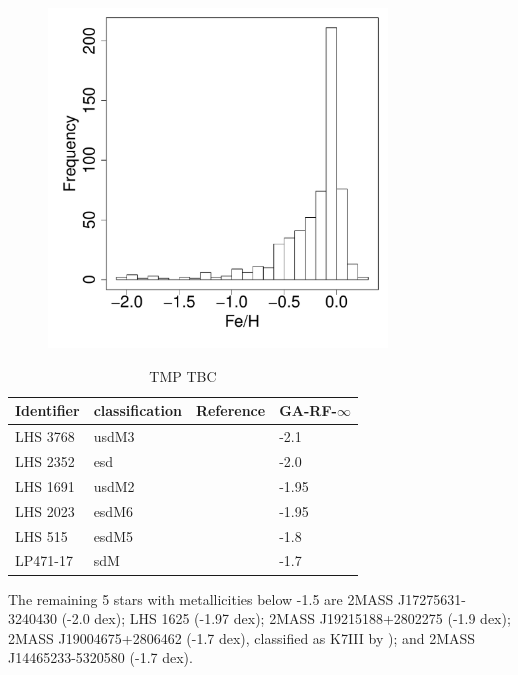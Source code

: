 \begin{figure}
	\begin{center}
		\includegraphics[width=9cm]{figs/ipac-figs/ipac-M-hist.pdf}
		\caption{}
		\label{fig:ipac-hist-mets}
	\end{center}
\end{figure}


\begin{table}\centering
	\begin{tabular}{@{}llll@{}}
		\toprule
		Identifier & classification & Reference & GA-RF-$\infty$\\
		\hline
		LHS 3768 & usdM3 & \cite{1995AJ....109..797K}  & -2.1 \\
		LHS 2352 & esd   & \cite{1995AJ....109..797K}  & -2.0 \\
		LHS 1691 & usdM2 & \cite{0004-637X-669-2-1235} & -1.95\\
		LHS 2023 & esdM6 & \cite{0004-637X-672-2-1153} & -1.95\\
		LHS 515  & esdM5 & \cite{1538-3873-117-833-676}& -1.8\\
		LP471-17 & sdM   & \cite{1995AJ....109..797K}  & -1.7\\
		\bottomrule
	\end{tabular}
	\caption{TMP TBC} 
	\label{tab:known-sds} 
\end{table}

The remaining 5 stars with metallicities below -1.5 are 2MASS J17275631-3240430 (-2.0 dex); 
LHS 1625 (-1.97 dex);  2MASS J19215188+2802275 (-1.9 dex); 2MASS J19004675+2806462 (-1.7 dex), 
classified as K7III by \cite{1994ApJS...94..749K}); and 2MASS J14465233-5320580 (-1.7 dex). 

